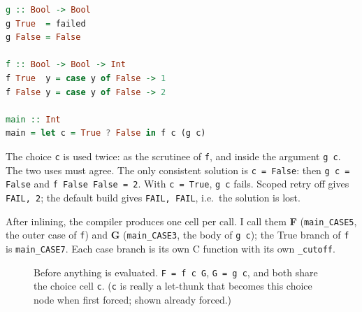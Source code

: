 \documentclass[11pt]{article}
\makeatletter
\newcommand{\code}[1]{\texttt{#1}}
\newcommand{\cn}[2]{{\scriptsize\itshape #1}\\[-1pt]{\ttfamily #2}}
\newcommand{\trailnode}[2]{\node[trail] at (#1) {%
  \begin{tabular}{@{}l@{\;}l@{\;}c@{\;}l@{\;}l@{}}
  \multicolumn{5}{@{}l@{}}{\itshape trail (top of stack first)}\\ #2 \hline
  \end{tabular}};}
\makeatother
\begin{document}
\begin{lstlisting}[language=Haskell]
g :: Bool -> Bool
g True  = failed
g False = False

f :: Bool -> Bool -> Int
f True  y = case y of False -> 1
f False y = case y of False -> 2

main :: Int
main = let c = True ? False in f c (g c)
\end{lstlisting}

The choice \code{c} is used twice: as the scrutinee of \code{f}, and inside
the argument \code{g c}. The two uses must agree. The only consistent
solution is \code{c = False}: then \code{g c = False} and \code{f False False
= 2}. With \code{c = True}, \code{g c} fails. Scoped retry off gives
\code{FAIL, 2}; the default build gives \code{FAIL, FAIL}, i.e.\ the solution
is lost.

After inlining, the compiler produces one cell per call. I call them
\textbf{F} (\code{main\_CASE5}, the outer case of \code{f}) and \textbf{G}
(\code{main\_CASE3}, the body of \code{g c}); the True branch of \code{f} is
\code{main\_CASE7}. Each case branch is its own C function with its own
\code{\_cutoff}.

\begin{figure}[p]
\centering
{}
\caption{Before anything is evaluated. \code{F = f c G}, \code{G = g c}, and
  both share the choice cell \code{c}. (\code{c} is really a let-thunk that
  becomes this choice node when first forced; shown already forced.)}
\label{fig:b0}
\end{figure}
\end{document}
